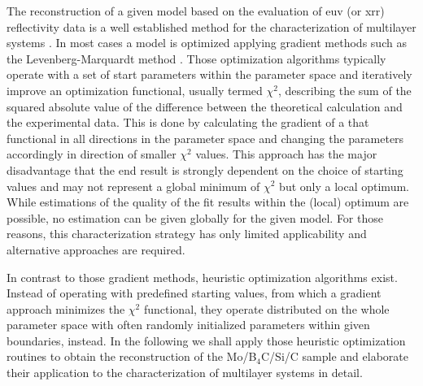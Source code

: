 The reconstruction of a given model based on the evaluation of \gls{euv} (or \gls{xrr}) reflectivity data is a well established method for the characterization of multilayer systems  \cite{lim_fabrication_2001, bajt_investigation_2001, braun_mo/si_2002}. In most cases a model is optimized applying gradient methods such as the Levenberg-Marquardt method \cite{levenberg_method_1944, marquardt_algorithm_1963}. Those optimization algorithms typically operate with a set of start parameters within the parameter space and iteratively improve an optimization functional, usually termed $\chi^2$, describing the sum of the squared absolute value of the difference between the theoretical calculation and the experimental data. This is done by calculating the gradient of a that functional in all directions in the parameter space and changing the parameters accordingly in direction of smaller $\chi^2$ values. This approach has the major disadvantage that the end result is strongly dependent on the choice of starting values and may not represent a global minimum of $\chi^2$ but only a local optimum. While estimations of the quality of the fit results within the (local) optimum are possible, no estimation can be given globally for the given model. For those reasons, this characterization strategy has only limited applicability and alternative approaches are required.

In contrast to those gradient methods, heuristic optimization algorithms exist. Instead of operating with predefined starting values, from which a gradient approach minimizes the $\chi^2$ functional, they operate distributed on the whole parameter space with often randomly initialized parameters within given boundaries, instead. In the following we shall apply those heuristic optimization routines to obtain the reconstruction of the Mo/B$_4$C/Si/C sample and elaborate their application to the characterization of multilayer systems in detail.

